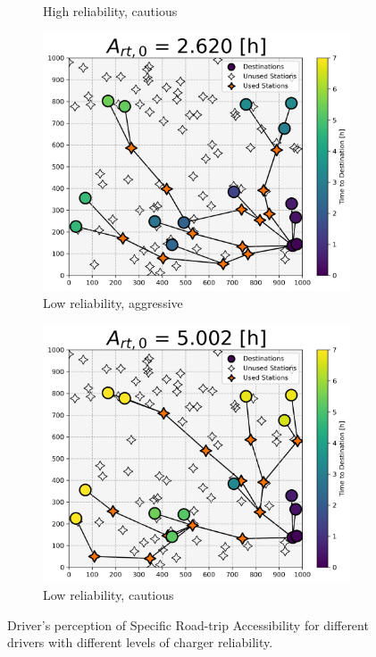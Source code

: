 \documentclass[11pt]{article}
\begin{document}
\begin{multicols}{2}
\begin{figure}[H]
\begin{subfigure}[t]{.5\linewidth}
		\caption{High reliability, cautious}
	\end{subfigure}
	\begin{subfigure}[t]{.5\linewidth}
		\centering\captionsetup{width = .8\linewidth}
		\includegraphics[width = \linewidth]{figs/random_example_low_reliability_aggressive.png}
		\caption{Low reliability, aggressive}
	\end{subfigure}%
	\begin{subfigure}[t]{.5\linewidth}
		\centering\captionsetup{width = .8\linewidth}
		\includegraphics[width = \linewidth]{figs/random_example_low_reliability_cautious.png}
		\caption{Low reliability, cautious}
	\end{subfigure}
	\caption{Driver's perception of Specific Road-trip Accessibility for different drivers with different levels of charger reliability.}
	\label{fig:perceived_srta_random}
\end{figure}


\end{multicols}
\end{document}
